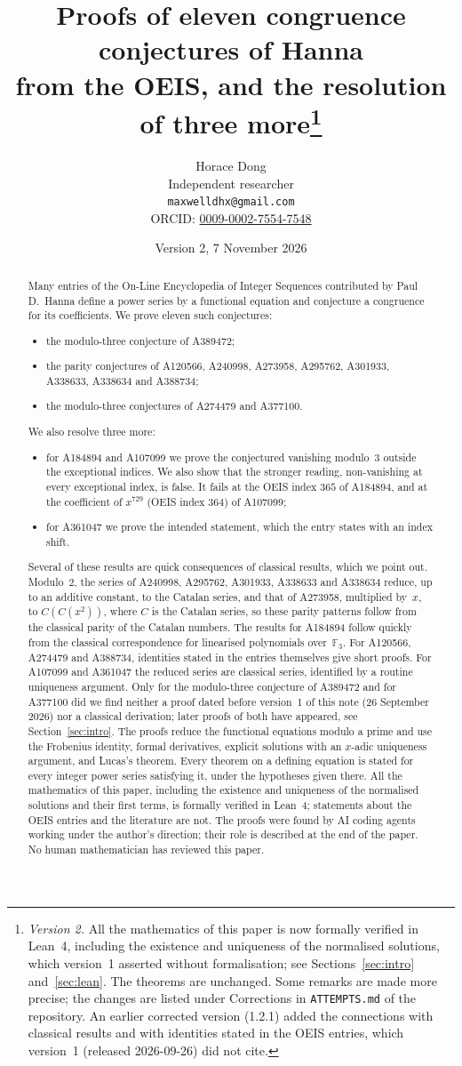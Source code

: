 \documentclass[11pt]{article}
\title{Proofs of eleven congruence conjectures of Hanna\\
from the OEIS, and the resolution of three more\thanks{\emph{Version 2.} All the mathematics of this paper is now formally
verified in Lean~4, including the existence and uniqueness of the normalised
solutions, which version~1 asserted without formalisation; see
Sections~\ref{sec:intro} and~\ref{sec:lean}. The theorems are unchanged. Some
remarks are made more precise; the changes are listed under Corrections in \texttt{ATTEMPTS.md} of the repository. An
earlier corrected version (1.2.1) added the connections with classical results
and with identities stated in the OEIS entries, which version~1 (released
2026-09-26) did not cite.}}
\author{Horace Dong\\ \small Independent researcher\\
\small\texttt{maxwelldhx@gmail.com}\\
\small ORCID: \href{https://orcid.org/0009-0002-7554-7548}{0009-0002-7554-7548}}
\date{Version 2, 7 November 2026}
\theoremstyle{remark}
\newcommand{\F}{\mathbb F}
\begin{document}
\maketitle
\begin{abstract}
Many entries of the On-Line Encyclopedia of Integer Sequences contributed by
Paul D.~Hanna define a power series by a functional equation and conjecture a
congruence for its coefficients. We prove eleven such conjectures:
\begin{itemize}
\item the modulo-three conjecture of A389472;
\item the parity conjectures of A120566, A240998, A273958, A295762, A301933,
 A338633, A338634 and A388734;
\item the modulo-three conjectures of A274479 and A377100.
\end{itemize}
We also resolve three more:
\begin{itemize}
\item for A184894 and A107099 we prove the conjectured vanishing modulo~$3$
 outside the exceptional indices. We also show that the stronger reading,
 non-vanishing at every exceptional index, is false. It fails at the
 OEIS index $365$ of A184894, and at the coefficient of $x^{729}$ (OEIS
 index $364$) of A107099;
\item for A361047 we prove the intended statement, which the entry states
 with an index shift.
\end{itemize}
Several of these results are quick consequences of classical results, which
we point out. Modulo~$2$, the series of A240998, A295762, A301933, A338633 and
A338634 reduce, up to an additive constant, to the Catalan series, and that
of A273958, multiplied by~$x$, to $C(C(x^2))$, where $C$ is the Catalan series, so these parity patterns
follow from the classical parity of the Catalan numbers. The results for
A184894 follow quickly from the classical correspondence for linearised
polynomials over~$\F_3$. For A120566, A274479 and A388734, identities stated
in the entries themselves give short proofs. For A107099 and A361047 the
reduced series are classical series, identified by a routine uniqueness
argument. Only for the modulo-three conjecture of A389472 and for A377100 did
we find neither a proof dated before version~1 of this note (26 September 2026)
nor a classical derivation; later proofs of both have appeared, see
Section~\ref{sec:intro}.
The proofs reduce the functional equations modulo a prime and use the
Frobenius identity, formal derivatives, explicit solutions with an $x$-adic
uniqueness argument, and Lucas's theorem. Every theorem on a defining equation
is stated for every integer power series satisfying it, under the hypotheses
given there. All the mathematics of this paper, including the existence and
uniqueness of the normalised solutions and their first terms, is formally
verified in Lean~4; statements about the OEIS entries and the literature are
not. The proofs were found by AI coding agents working under the author's
direction; their role is described at the end of the paper. No human
mathematician has reviewed this paper.
\end{abstract}
\end{document}
